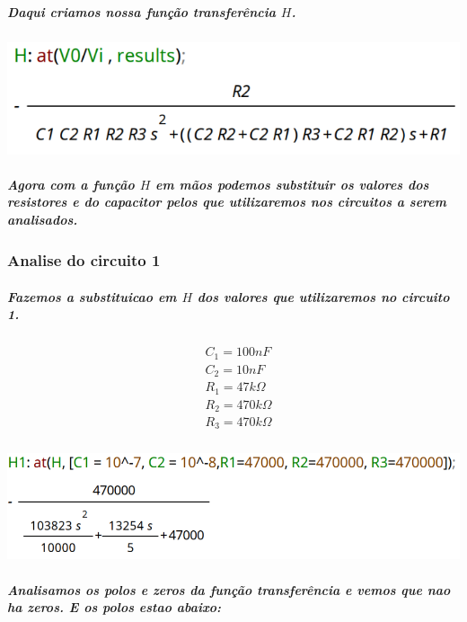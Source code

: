 \documentclass[12pt,twoside, a4paper, twocolumn]{article}
\begin{document}
\subparagraph*{Daqui criamos nossa função transferência $H$.}


\subparagraph*{}


\begin{adjustbox}{scale=0.4}
    \includegraphics{H.png}
\end{adjustbox}


\subparagraph*{Agora com a função $H$ em mãos podemos substituir os valores dos resistores e do capacitor pelos que utilizaremos nos circuitos a serem analisados.}

\subsubsection{Analise do circuito 1}

\subparagraph*{Fazemos a substituicao em $H$ dos valores que utilizaremos no circuito 1.}


\begin{equation*}
    \begin{aligned}
         & C_1  = 100nF          \\
         & C_2  = 10nF           \\
         & R_1  = 47k \varOmega  \\
         & R_2  = 470k \varOmega \\
         & R_3  = 470k \varOmega
    \end{aligned}
\end{equation*}


\subparagraph*{}


\begin{adjustbox}{scale=0.34}
    \includegraphics{H1.png}
\end{adjustbox}


\subparagraph*{Analisamos os polos e zeros da função transferência e vemos que nao ha zeros. E os polos estao abaixo:}
\end{document}
